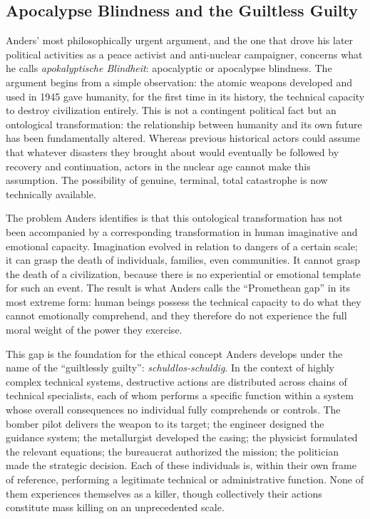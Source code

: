 \documentclass[12pt]{memoir}
\begin{document}
\subsection{Apocalypse Blindness and the Guiltless Guilty}

Anders' most philosophically urgent argument, and the one that drove his later political
activities as a peace activist and anti-nuclear campaigner, concerns what he calls
\textit{apokalyptische Blindheit}: apocalyptic or apocalypse blindness. The argument begins
from a simple observation: the atomic weapons developed and used in 1945 gave humanity, for
the first time in its history, the technical capacity to destroy civilization entirely. This
is not a contingent political fact but an ontological transformation: the relationship between
humanity and its own future has been fundamentally altered. Whereas previous historical actors
could assume that whatever disasters they brought about would eventually be followed by
recovery and continuation, actors in the nuclear age cannot make this assumption. The
possibility of genuine, terminal, total catastrophe is now technically available.

The problem Anders identifies is that this ontological transformation has not been accompanied
by a corresponding transformation in human imaginative and emotional capacity. Imagination
evolved in relation to dangers of a certain scale; it can grasp the death of individuals,
families, even communities. It cannot grasp the death of a civilization, because there is no
experiential or emotional template for such an event. The result is what Anders calls the
\enquote{Promethean gap} in its most extreme form: human beings possess the technical capacity
to do what they cannot emotionally comprehend, and they therefore do not experience the full
moral weight of the power they exercise.\citep[233--308]{anders1980}

This gap is the foundation for the ethical concept Anders develops under the name of the
\enquote{guiltlessly guilty}: \textit{schuldlos-schuldig}. In the context of highly
complex technical systems, destructive actions are distributed across chains of technical
specialists, each of whom performs a specific function within a system whose overall consequences
no individual fully comprehends or controls. The bomber pilot delivers the weapon to its
target; the engineer designed the guidance system; the metallurgist developed the casing; the
physicist formulated the relevant equations; the bureaucrat authorized the mission; the
politician made the strategic decision. Each of these individuals is, within their own frame of
reference, performing a legitimate technical or administrative function. None of them
experiences themselves as a killer, though collectively their actions constitute mass killing
on an unprecedented scale.
\end{document}
